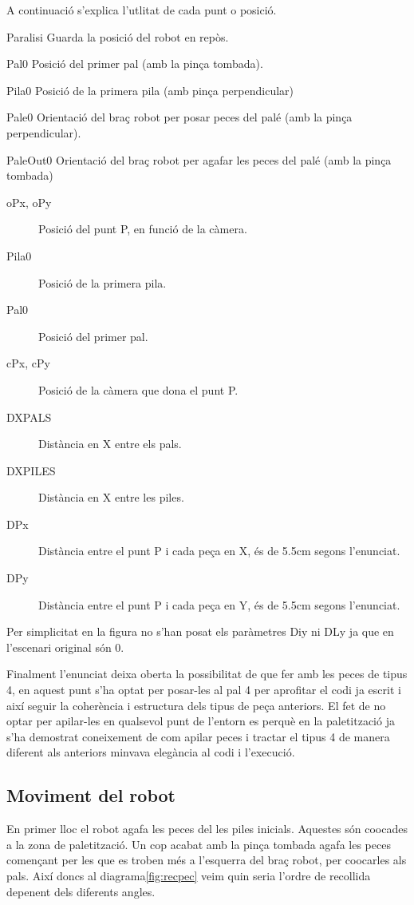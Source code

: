 A continuació s'explica l'utlitat de cada punt o posició.

\begin{desciption}
 \item [Paralisi] Guarda la posició del robot en repòs.
 \item [Pal0] Posició del primer pal (amb la pinça tombada).
 \item [Pila0] Posició de la primera pila (amb pinça perpendicular)
 \item [Pale0] Orientació del braç robot per posar peces del palé (amb la pinça
perpendicular).
 \item [PaleOut0] Orientació del braç robot per agafar les peces del palé
(amb la pinça tombada) 
\end{desciption}




\begin{description}
 \item [oPx, oPy] Posició del punt P, en funció de la càmera.
 \item [Pila0] Posició de la primera pila.
 \item [Pal0] Posició del primer pal.
 \item [cPx, cPy] Posició de la càmera que dona el punt P.
 \item [DXPALS] Distància en X entre els pals.
 \item [DXPILES] Distància en X entre les piles.
 \item [DPx] Distància entre el punt P i cada peça en X, és de 5.5cm segons
l'enunciat.
 \item [DPy] Distància entre el punt P i cada peça en Y, és de 5.5cm segons
l'enunciat.
\end{description}

Per simplicitat en la figura no s'han posat els paràmetres Diy ni DLy
ja que en l'escenari original són 0.

Finalment l'enunciat deixa oberta la possibilitat de que fer amb les peces de
tipus 4, en aquest punt s'ha optat per posar-les al pal 4 per aprofitar el codi ja escrit i
així seguir la coherència i estructura dels tipus de peça anteriors. El fet de
no optar per apilar-les en qualsevol punt de l'entorn es perquè en la paletització
ja s'ha demostrat coneixement de com apilar peces i tractar el tipus 4 de manera
diferent als anteriors minvava elegància al codi i l'execució.

\subsection{Moviment del robot}
En primer lloc el robot agafa les peces del les piles inicials.
Aquestes són co\lgem ocades a la zona de paletització. Un cop acabat amb la pinça
tombada agafa les peces començant per les que es troben més a l'esquerra
del braç robot, per co\lgem ocarles als pals. Així doncs al diagrama\ref{fig:recpec}
veim quin seria l'ordre de recollida depenent dels diferents angles.

